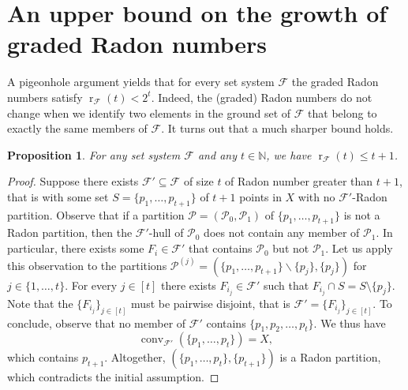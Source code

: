 \documentclass[11pt]{article}
\newcommand{\N}{\mathbb{N}}
\newcommand{\F}{\mathcal{F}}
\DeclareMathOperator{\conv}{conv}
\DeclareMathOperator{\rad}{r}
\newtheorem{proposition}[lemma]{Proposition}
\begin{document}
\section{An upper bound on the growth of graded Radon numbers}\label{app:rab}
%
A pigeonhole argument yields that for every set system $\F$ the graded Radon numbers satisfy $\rad_\F(t)< 2^t$. Indeed, the (graded) Radon numbers do not change when we identify two elements in the ground set of $\F$ that belong to exactly the same members of $\F$. It turns out that a much sharper bound holds.
%
\begin{proposition}
 For any set system $\F$ and any $t \in \N$, we have $\rad_{\mathcal{F}}(t)\leq t+1$.
\end{proposition}
\begin{proof}
  Suppose there exists $\mathcal{F}' \subseteq \F$ of size $t$ of Radon number greater than $t+1$, that is with some set $S=\{p_1,\dots,p_{t+1}\}$ of $t+1$ points in $X$ with no $\F'$-Radon partition.
%
  \medskip
%
  Observe that if a partition $\mathcal{P}=(\mathcal{P}_0,\mathcal{P}_1)$ of $\{p_1,\dots,p_{t+1}\}$ is not a Radon partition, then the $\F'$-hull of $\mathcal{P}_0$ does not contain any member of $\mathcal{P}_1$. In particular, there exists some $F_i\in\F'$ that contains $\mathcal{P}_0$ but not $\mathcal{P}_1$.
%
  \medskip
%
  Let us apply this observation to the partitions $\mathcal{P}^{(j)}=(\{p_1,\dots,p_{t+1}\}\backslash \{p_j\},\{p_j\})$ for $j\in\{1,\dots,t\}$. For every $j \in [t]$ there exists $F_{i_j}\in\mathcal{F}'$ such that $F_{i_j} \cap S = S \setminus \{p_j\}$. Note that the $\{F_{i_j}\}_{j \in [t]}$ must be pairwise disjoint, that is $\F' = \{F_{i_j}\}_{j \in [t]}$.
%
  \medskip
%
  To conclude, observe that no member of $\F'$ contains $\{p_1,p_2, \ldots, p_t\}$. We thus have
  \[ \conv_{\mathcal{F}'}(\{p_1,\dots,p_t\})=X,\]
  which contains $p_{t+1}$. Altogether, $(\{p_1,\dots,p_t\},\{p_{t+1}\})$ is a Radon partition, which contradicts the initial assumption.
\end{proof}
%
\end{document}
